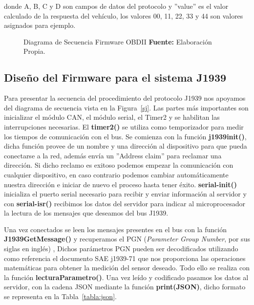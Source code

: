 donde A, B, C y D son campos de datos del protocolo y ''value'' es el valor calculado de la respuesta del vehículo, los valores 00, 11, 22, 33 y 44 son valores asignados para ejemplo. 

 




\begin{figure}[H]
	\centering
	\begin{center}
		
	\end{center}
	\caption[Diagrama de Secuencia Firmware OBDII.]{Diagrama de Secuencia Firmware OBDII \textbf{ Fuente:} Elaboración Propia.}
	\label{sobd} %
\end{figure}



\subsection{Diseño del Firmware para el sistema J1939}

Para presentar la secuencia del procedimiento del protocolo J1939 nos apoyamos del diagrama de secuencia vista en la Figura~\ref{sj}.
Las partes más importantes son inicializar el módulo CAN, el módulo serial, el Timer2 y se habilitan las interrupciones necesarias. 
El {\bfseries timer2()} se utiliza como temporizador para medir los tiempos de comunicación con el bus. 
Se comienza con la función {\bfseries j1939init()}, dicha función provee de un nombre y una dirección al dispositivo para que pueda conectarse a la red, además envía un ''Address claim'' para reclamar una dirección. 
Si dicho reclamo es exitoso podemos empezar la comunicación con cualquier dispositivo, en caso contrario podemos cambiar automáticamente nuestra dirección e iniciar de nuevo el proceso hasta tener éxito. 
{\bfseries serial-init()} inicializa el puerto serial necesario para recibir y enviar información al servidor y con {\bfseries serial-isr() } recibimos los datos del servidor para indicar al microprocesador la lectura de los mensajes que deseamos del bus J1939. 

Una vez conectados se leen los mensajes presentes en el bus con la función {\bfseries J1939GetMessage()} y recuperamos el PGN (\textit{Parameter Group Number}, por sus siglas en inglés) , 
Dichos parámetros PGN pueden ser decodificados utilizando como referencia el documento SAE j1939-71 que nos proporciona las operaciones matemáticas para obtener la medición del sensor deseado.  
Todo ello se realiza con la función {\bfseries lecturaParametro()}.
Una vez leído y codificado pasamos los datos al servidor, con la cadena JSON  mediante la función {\bfseries print(JSON)}, dicho formato se representa en la Tabla~\ref{tabla:json}. 


